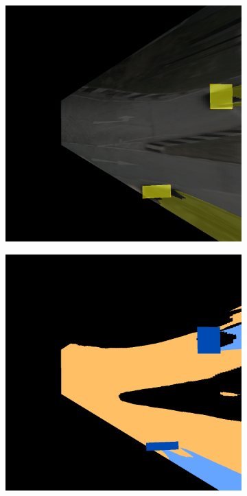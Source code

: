 \begin{figure}[h!]
\begin{subfigure}[b]{0.22\textwidth}
        \caption{}
        \label{fig:bev_occupancy_occlusion_b}
    \end{subfigure}
    \hfill
    \begin{subfigure}[b]{0.22\textwidth}
        \includegraphics[width=\textwidth]{images/methodology/bev_occupancy_oclusion/bev_occ_9.png}
        \caption{}
        \label{fig:bev_occupancy_occlusion_c}
    \end{subfigure}
    \hfill
    \begin{subfigure}[b]{0.22\textwidth}
        \includegraphics[width=\textwidth]{images/methodology/bev_occupancy_oclusion/dt_occ_mask_colored_9.png}
        \caption{}
        \label{fig:bev_occupancy_occlusion_d}
    \end{subfigure}


\end{figure}
